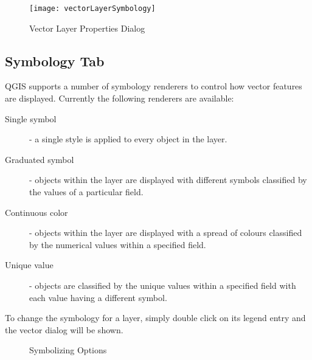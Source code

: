\begin{figure}[ht]
   \centering
   \caption{Vector Layer Properties Dialog \nixcaption}\label{fig:vector_symbology}
   \texttt{[image: vectorLayerSymbology]} 
 \end{figure}

\subsection{Symbology Tab}\label{sec:symbology}

QGIS supports a number of symbology renderers to control how
vector features are displayed. Currently the following renderers
are available:

\begin{description} 
    \item[Single symbol] - a single style is applied to every
    object in the layer.
    \item[Graduated symbol] - objects within the layer are
    displayed with different symbols classified by the values of a
    particular field.
    \item[Continuous color] - objects within the layer are
    displayed with a spread of colours classified by the numerical
    values within a specified field.
    \item[Unique value] - objects are classified by the unique
    values within a specified field with each value having a
    different symbol.
\end{description}

To change the symbology for a layer, simply double click on its legend 
entry and the vector  dialog will be 
shown.

\begin{figure}[ht]
\centering
\caption{Symbolizing Options \nixcaption}
   \hspace{1cm}
   \hspace{1cm}
   \hspace{1cm}
\end{figure}

